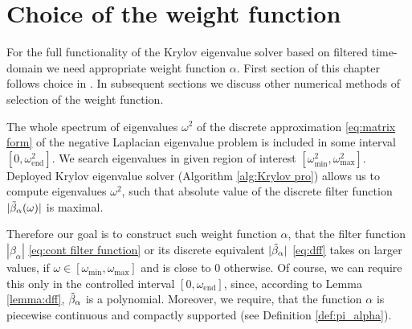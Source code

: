 \documentclass[a4paper,11pt,bibliography=totoc,listof=totoc,headinclude=true,cleardoublepage=empty,oneside]{scrbook}
\newcommand{\dff}{\Tilde{\beta}_\alpha}
\newcommand{\e}{\mathrm{end}}
\begin{document}
\chapter{Choice of the weight function}
\label{chapter:function}
For the full functionality of the Krylov eigenvalue solver based on filtered time-domain we need appropriate weight function $\alpha$. First section of this chapter follows choice in \cite{nannen}. In subsequent sections we discuss other numerical methods of selection of the weight function.

The whole spectrum of eigenvalues $\omega^2$ of the discrete approximation \eqref{eq:matrix form} of the negative Laplacian eigenvalue problem is included in some interval $\left[0, \omega_\e^2\right]$. We search eigenvalues in given region of interest $\left[\omega_{\min}^2, \omega_{\max}^2\right]$. Deployed Krylov eigenvalue solver (Algorithm \ref{alg:Krylov pro}) allows us to compute eigenvalues $\omega^2$, such that absolute value of the discrete filter function $|\dff(\omega)|$ is maximal. 

Therefore our goal is to construct such weight function $\alpha$, that the filter function $|\beta_\alpha|$ \eqref{eq:cont filter function} or its discrete equivalent $|\dff|$ \eqref{eq:dff} takes on larger values, if $\omega \in \left[\omega_{\min}, \omega_{\max} \right]$ and is close to 0 otherwise. Of course, we can require this only in the controlled interval $\left[0, \omega_\e\right]$, since, according to Lemma \ref{lemma:dff}, $\dff$ is a polynomial. Moreover, we require, that the function $\alpha$ is piecewise continuous and compactly supported (see Definition \ref{def:pi_alpha}).
\end{document}
